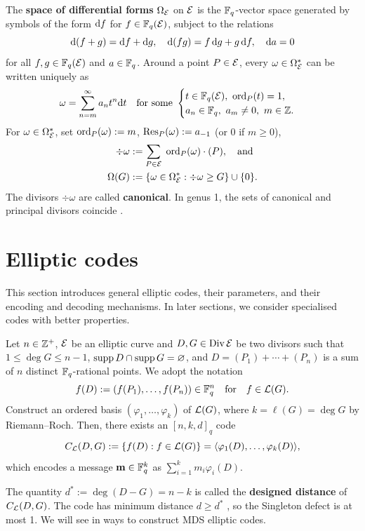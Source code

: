 \documentclass[twocolumn, 11pt]{scrartcl}
\begin{document}
The \textbf{space of differential forms} $\Omega_\mcE$ on $\mcE$ is the $\bbF_q$-vector space generated by symbols of the form $\df$ for $f\in\bbF_q(\mcE)$, subject to the relations
\[ \dx[(f+g)]=\df+\dg,\quad \dx[(fg)]=f\,\dg+g\,\df,\quad \da=0 \]
for all $f,g\in\bbF_q(\mcE)$ and $a\in\bbF_q$. Around a point $P\in\mcE$, every $\omega\in\Omega_\mcE^*$ can be written uniquely as
\[ \omega=\sum_{n=m}^\infty a_nt^n\dt\quad\text{for some  } \begin{cases}
        t\in\bbF_q(\mcE),\ \ord_P(t)=1, \\
        a_n\in\bbF_q,\ a_m\neq 0,\ m\in\bbZ.
    \end{cases} \]
For $\omega\in\Omega_\mcE^*$, set $\ord_P(\omega):=m$, $\Res_P(\omega):=a_{-1}$ (or 0 if $m\geq 0$),
\vspace{-9pt}
\begin{align*}
    \div\omega&:=\sum_{P\in\mcE}\;\ord_P(\omega)\cdot(P),\quad\text{and}\\
    \Omega(G)&:=\set{\omega\in\Omega_\mcE^*:\div\omega\geq G}\cup\set0.
\end{align*}
The divisors $\div\omega$ are called \textbf{canonical}. In genus 1, the sets of canonical and principal divisors coincide \cite[Cor.~1.4.12]{stichtenoth2009algebraic}.

\section{Elliptic codes} \label{section:ecc}

This section introduces general elliptic codes, their parameters, and their encoding and decoding mechanisms. In later sections, we consider specialised codes with better properties.

Let $n\in\bbZ^+$, $\mcE$ be an elliptic curve and $D,G\in\Div\mcE$ be two divisors such that $1\leq\deg G\leq n-1$, $\supp D\cap\supp G=\emptyset$, and $D=(P_1)+\cdots+(P_n)$ is a sum of $n$ distinct $\bbF_q$-rational points. We adopt the notation
\[ f(D):=(f(P_1),\hdots,f(P_n))\in\bbF_q^n\qtx{for}f\in\mcL(G). \]
Construct an ordered basis $(\varphi_1,\hdots,\varphi_k)$ of $\mcL(G)$, where $k=\ell(G)=\deg G$ by Riemann--Roch. Then, there exists an $[n,k,d]_q$ code
\[ C_\mcL(D,G):=\set{f(D):f\in\mcL(G)}=\ang{\varphi_1(D),\hdots,\varphi_k(D)}, \]
which encodes a message $\bfm\in\bbF_q^k$ as $\sum_{i=1}^k m_i\varphi_i(D)$.

The quantity $d^*:=\deg(D-G)=n-k$ is called the \textbf{designed distance} of $C_\mcL(D,G)$. The code has minimum distance $d\geq d^*$ \cite[\S2]{stichtenoth2009algebraic}, so the Singleton defect is at most 1. We will see in  ways to construct MDS elliptic codes.
\end{document}
